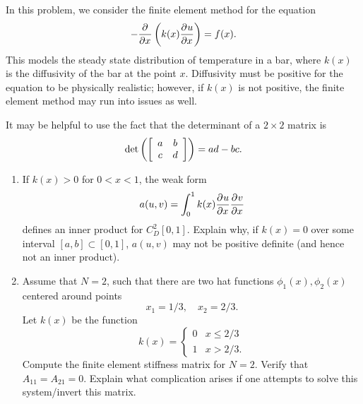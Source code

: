 In this problem, we consider the finite element method for the equation
\[
-\frac{\partial^{} }{\partial x^{}}\left(k(x)\frac{\partial^{} u}{\partial x^{}}\right) = f(x).
\]
This models the steady state distribution of temperature in a bar, where $k(x)$ is the diffusivity of the bar at the point $x$.  Diffusivity must be positive for the equation to be physically realistic; however, if $k(x)$ is not positive, the finite element method may run into issues as well.  

It may be helpful to use the fact that the determinant of a $2\times 2$ matrix is
\[
{\rm det}\left(\left[
\begin{array}{cc}
a &b\\
c &d
\end{array}
\right]\right) = ad-bc.
\]

\begin{enumerate}
\item If $k(x) > 0$ for $0 < x < 1$, the weak form
\[
a(u,v) = \int_0^1 k(x)\frac{\partial^{} u}{\partial x^{}}\frac{\partial^{} v}{\partial x^{}}
\]
defines an inner product for $C^2_D[0,1]$.  Explain why, if $k(x) = 0$ over some interval $[a,b] \subset [0,1]$, $a(u,v)$ may not be positive definite (and hence not an inner product).  
\item Assume that $N = 2$, such that there are two hat functions $\phi_1(x),\phi_2(x)$ centered around points 
\[
x_1 = 1/3, \quad x_2 = 2/3.
\]
%
Let $k(x)$ be the function
\[
k(x) = \begin{cases}
0 & x \leq 2/3\\
1 & x > 2/3.
\end{cases}
\]
Compute the finite element stiffness matrix for $N=2$.  Verify that $A_{11} = A_{21} = 0$.
Explain what complication arises if one attempts to solve this system/invert this matrix.  %
\end{enumerate}